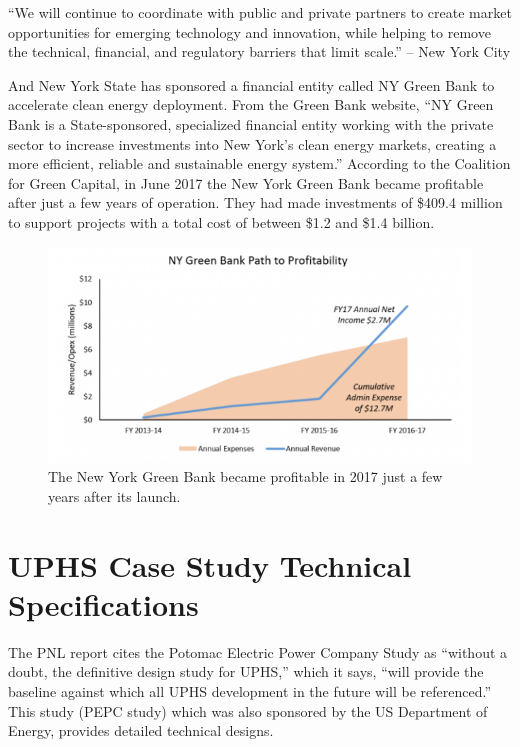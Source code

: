 \documentclass[hidelinks,12pt,a4paper]{article}
\begin{document}
\begin{displayquote}
“We will continue to coordinate with public and private partners to create market opportunities for emerging technology and innovation, while helping to remove the technical, financial, and regulatory barriers that limit scale.” \cite{OneNYC2050FullReport} -- New York City
\end{displayquote}

And New York State has sponsored a financial entity called NY Green Bank to accelerate clean energy deployment. From the Green Bank website, “NY Green Bank is a State-sponsored, specialized financial entity working with the private sector to increase investments into New York’s clean energy markets, creating a more efficient, reliable and sustainable energy system.” \cite{NYGreenBank} According to the Coalition for Green Capital, in June 2017 the New York Green Bank became profitable after just a few years of operation. They had made investments of \$409.4 million to support projects with a total cost of between \$1.2 and \$1.4 billion. \cite{NYGreenBankPathToProfitability}

\begin{figure}[ht!]
    \centering
    \includegraphics[width=1\textwidth]{new-york-green-bank-path-to-profitability.png}
    \caption{The New York Green Bank became profitable in 2017 just a few years after its launch. \cite{NYGreenBankPathToProfitability}}
\end{figure}
\FloatBarrier

\pagebreak[4]
\section{UPHS Case Study Technical Specifications}

The PNL report cites the Potomac Electric Power Company Study as
“without a doubt, the definitive design study for UPHS,” which it says, “will provide the baseline against which all UPHS development in the future will be referenced.” This study (PEPC study) which was also sponsored by the US Department of Energy, provides detailed technical designs.
\end{document}

